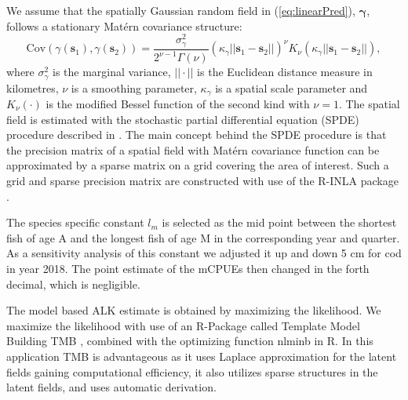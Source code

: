 \documentclass[a4paper 12pt]{article}
\numberwithin{equation}{section}
\begin{document}
\indent We assume that the spatially Gaussian random field in (\ref{eq:linearPred}), $\pmb{\gamma}$, follows a stationary Mat\'{e}rn covariance structure:
\begin{equation}\label{eq:matern}
 \text{Cov}(\gamma(\mathbf{s}_1),\gamma(\mathbf{s}_2)) = \frac{\sigma^2_{\gamma}}{2^{\nu-1}\Gamma(\nu)}(\kappa_{\gamma}||\mathbf{s}_1 -\mathbf{s}_2||)^{\nu}K_{\nu}(\kappa_{\gamma}||\mathbf{s}_1-\mathbf{s}_2||),
\end{equation}
where $\sigma^2_{\gamma}$ is the marginal variance, $||\cdot||$ is the Euclidean distance measure in kilometres, $\nu$ is a smoothing parameter, $\kappa_{\gamma}$ is a spatial scale parameter and $K_{\nu}(\cdot)$ is the modified Bessel function of the second kind with $\nu = 1$. The spatial field is estimated with the stochastic partial differential equation (SPDE) procedure described in \citet{lindgren2011explicit}. The main concept behind the SPDE procedure is that the precision matrix of a spatial field with Mat\'{e}rn  covariance function can be approximated by a sparse matrix on a grid covering the area of interest. Such a grid and sparse precision matrix are constructed with use of the R-INLA package \citep{rue2009approximate}.

The species specific constant $l_m$ is selected as the mid point between the shortest fish of age A and the longest fish of age M in the corresponding year and quarter. As a sensitivity analysis of this constant we adjusted it up and down 5 cm for cod in year 2018. The point estimate of the mCPUEs then changed in the forth decimal, which is negligible.

The model based ALK estimate is obtained by maximizing the likelihood. We maximize the likelihood with use of an R-Package called Template Model Building {\sffamily TMB} \citep{kristensen2015tmb}, combined with the optimizing function {\sffamily nlminb} in R. In this application {\sffamily TMB} is advantageous as it uses Laplace approximation for the latent fields gaining computational efficiency, it also utilizes sparse structures in the latent fields, and uses automatic derivation. 
\end{document}
